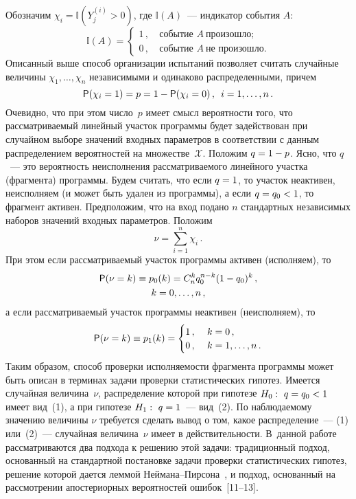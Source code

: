 \begin{multicols}{2}
Обозначим $\chi_i=\mathbb{I}(Y_j^{(i)}>0)$, где $\mathbb{I}(A)$~---
индикатор события $A$:
$$
\mathbb{I}(A)=
\begin{cases}
1\,,&\ \mbox{событие } A\  \mbox{произошло;}\\ 
0\,, &\ \mbox{событие } A\  \mbox{не\ произошло.}
\end{cases}
$$
Описанный выше способ организации испытаний позволяет считать
случайные величины $\chi_1,\ldots,\chi_n$ независимыми и одинаково
распределенными, причем
$$
{\sf P}(\chi_i=1)=p=1-{\sf P}(\chi_i=0)\,,\enskip i=1,\ldots,n\,.
$$
Очевидно, что при этом число~$p$ имеет смысл вероятности того, что
рассматриваемый линейный учас\-ток программы будет задействован при
случайном выборе значений входных параметров в соответствии с данным
распределением вероятностей на множестве~$\mathcal{X}$. Положим
$q\hm=1\hm-p$. Ясно, что $q$~--- это вероятность неисполнения
рассматриваемого линейного участка (фрагмента) программы. Будем
считать, что если $q\hm=1$, то участок неактивен, неисполняем (и может
быть удален из программы), а если $q\hm=q_0\hm<1$, то фрагмент активен.
Предположим, что на вход подано $n$ стандартных независимых наборов
значений входных параметров. Положим
$$
\nu=\sum\limits_{i=1}^n\chi_i\,.
$$
При этом если рассматриваемый участок программы активен (исполняем),
то
\begin{multline}
{\sf P}(\nu=k)\equiv p_0(k)=C_n^kq_0^{n-k}(1-q_0)^k\,, \\
k=0,\ldots,n\,,\label{e1-kor}
\end{multline}
а если рассматриваемый участок программы неактивен (неисполняем), то
\begin{equation}
{\sf P}(\nu=k)\equiv p_1(k)=
\begin{cases}
1\,,&\ k=0\,,\\
0\,,&\ k=1,\ldots,n\,.
\end{cases}
\label{e2-kor}
\end{equation}
Таким образом, способ проверки исполняемости фрагмента программы
может быть описан в терминах задачи проверки статистических гипотез.
Имеется случайная величина~$\nu$, распределение которой при гипотезе
$H_0:\ q\hm=q_0\hm<1$ имеет вид~(1), а при гипотезе $H_1:\ q\hm=1$~--- вид~(2). 
По наблюдаемому значению величины $\nu$ требуется сделать вывод
о том, какое распределение~--- (1) или~(2)~--- случайная величина~$\nu$ 
имеет в действительности. В~данной работе рассматриваются два
подхода к решению этой задачи: традиционный подход, основанный на
стандартной постановке задачи проверки статистических гипотез,
решение которой дается леммой Ней\-ма\-на--Пир\-со\-на~\cite{Lehman1979}, и
подход, основанный на рассмотрении апостериорных вероятностей ошибок~[11--13].


\end{multicols}
